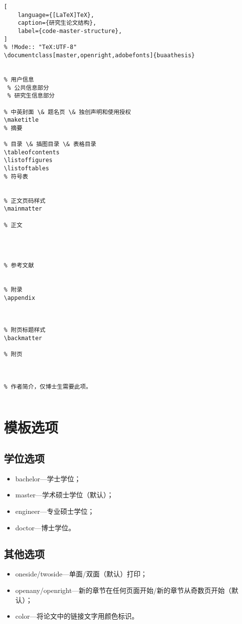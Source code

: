 \begin{lstlisting}[
    language={[LaTeX]TeX},
    caption={研究生论文结构},
    label={code-master-structure},
]
% !Mode:: "TeX:UTF-8"
\documentclass[master,openright,adobefonts]{buaathesis}


% 用户信息
 % 公共信息部分
 % 研究生信息部分

% 中英封面 \& 题名页 \& 独创声明和使用授权
\maketitle
% 摘要

% 目录 \& 插图目录 \& 表格目录
\tableofcontents
\listoffigures
\listoftables
% 符号表


% 正文页码样式
\mainmatter

% 正文




% 参考文献


% 附录
\appendix



% 附页标题样式
\backmatter

% 附页



% 作者简介，仅博士生需要此项。


\end{lstlisting}
    
\section{模板选项}
\subsection{学位选项}
    \begin{itemize}
        \item bachelor---学士学位；
        \item master---学术硕士学位（默认）；
        \item engineer---专业硕士学位；
        \item doctor---博士学位。
    \end{itemize}

\subsection{其他选项}
    \begin{itemize}
        \item oneside\slash twoside---单面\slash 双面（默认）打印；
        \item openany\slash openright---新的章节在任何页面开始\slash 新的章节从奇数页开始（默认）；
        \item color---将论文中的链接文字用颜色标识。
    \end{itemize}

